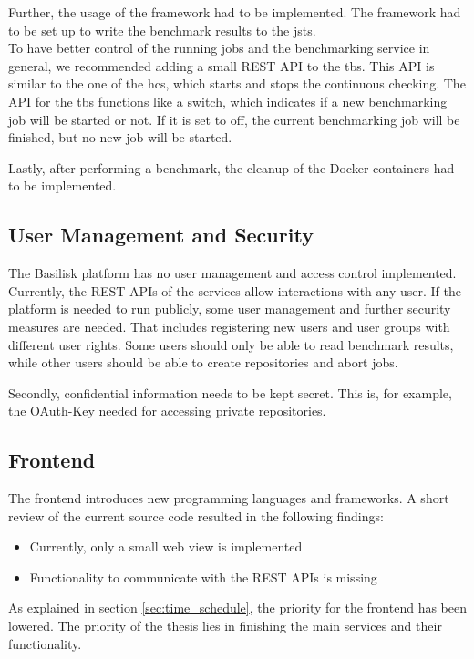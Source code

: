 Further, the usage of the \iguana{} framework had to be implemented.
The framework had to be set up to write the benchmark results to the \acl{jsts}.
\\

To have better control of the running jobs and the benchmarking service in general, we recommended adding a small REST API to the \ac{tbs}.
This API is similar to the one of the \ac{hcs}, which starts and stops the continuous checking.
The API for the \ac{tbs} functions like a switch, which indicates if a new benchmarking job will be started or not.
If it is set to off, the current benchmarking job will be finished, but no new job will be started.

Lastly, after performing a benchmark, the cleanup of the Docker containers had to be implemented.

\subsection{User Management and Security}
\label{sec:review_user_management}
The Basilisk platform has no user management and access control implemented.
Currently, the REST APIs of the services allow interactions with any user.
If the platform is needed to run publicly, some user management and further security measures are needed.
That includes registering new users and user groups with different user rights.
Some users should only be able to read benchmark results, while other users should be able to create repositories and abort jobs.

Secondly, confidential information needs to be kept secret.
This is, for example, the OAuth-Key needed for accessing private \gh{} repositories.


\subsection{Frontend}
\label{sec:review_frontend}
The frontend introduces new programming languages and frameworks.
A short review of the current source code resulted in the following findings:
\begin{itemize}
	\item Currently, only a small web view is implemented
	\item Functionality to communicate with the REST APIs is missing
\end{itemize}


As explained in section \ref{sec:time_schedule}, the priority for the frontend has been lowered.
The priority of the thesis lies in finishing the main services and their functionality.

